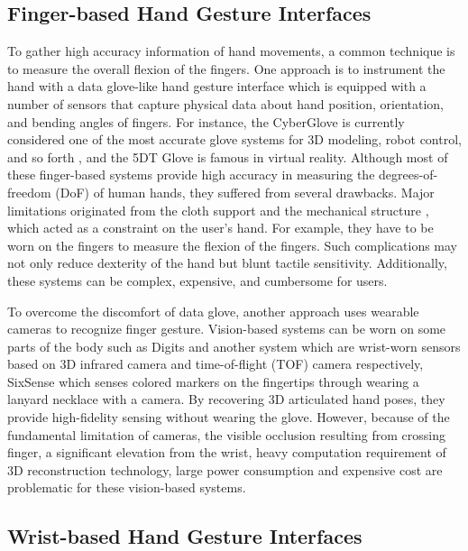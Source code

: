 \documentclass{sigchi}
\begin{document}
\subsection{Finger-based Hand Gesture Interfaces}
To gather high accuracy information of hand movements, a common technique is to measure the overall flexion of the fingers. One approach is to instrument the hand with a data glove-like hand gesture interface \cite{4539650, 1546364, 806717, tsukada2001ubi} which is equipped with a number of sensors that capture physical data about hand position, orientation, and bending angles of fingers.
For instance, the CyberGlove \cite{1414484} is currently considered one of the most accurate glove systems for 3D modeling, robot control, and so forth \cite{Burdea:2003:VRT:829566, LaViola:1999:SHP:864649}, and the 5DT Glove \cite{5DT} is famous in virtual reality. 
Although most of these finger-based systems provide high accuracy in measuring the degrees-of-freedom (DoF) of human hands, they suffered from several drawbacks. 
Major limitations originated from the cloth support and the mechanical structure \cite{4539650}
, which acted as a constraint on the user’s hand. For example, they have to be worn on the fingers to measure the flexion of the fingers. Such complications may not only reduce dexterity of the hand but blunt tactile sensitivity. Additionally, these systems can be complex, expensive, and cumbersome for users.

To overcome the discomfort of data glove, another approach uses wearable cameras to recognize finger gesture. Vision-based systems can be worn on some parts of the body such as Digits \cite{Kim:2012:DFI:2380116.2380139} and another system \cite{6855631} which are wrist-worn sensors based on 3D infrared camera and time-of-flight (TOF) camera respectively, SixSense\cite{Mistry:2009:SWG:1667146.1667160} which senses colored markers on the fingertips through wearing a lanyard necklace with a camera. By recovering 3D articulated hand poses, they provide high-fidelity sensing without wearing the glove. However, because of the fundamental limitation of cameras, the visible occlusion resulting from crossing finger, a significant elevation from the wrist, heavy computation requirement of 3D reconstruction technology, large power consumption and expensive cost are problematic for these vision-based systems.

\subsection{Wrist-based Hand Gesture Interfaces}
\end{document}
